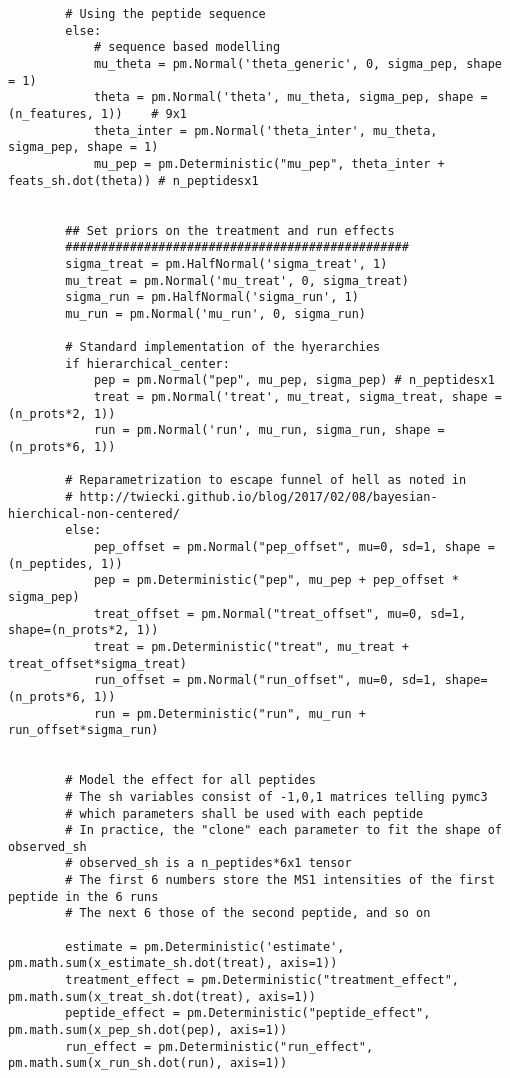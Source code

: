 \documentclass[a4paper]{article}
\begin{document}
\begin{verbatim}
        # Using the peptide sequence
        else: 
            # sequence based modelling
            mu_theta = pm.Normal('theta_generic', 0, sigma_pep, shape = 1)
            theta = pm.Normal('theta', mu_theta, sigma_pep, shape = (n_features, 1))    # 9x1
            theta_inter = pm.Normal('theta_inter', mu_theta, sigma_pep, shape = 1)
            mu_pep = pm.Deterministic("mu_pep", theta_inter + feats_sh.dot(theta)) # n_peptidesx1


        ## Set priors on the treatment and run effects
        ################################################    
        sigma_treat = pm.HalfNormal('sigma_treat', 1)
        mu_treat = pm.Normal('mu_treat', 0, sigma_treat)
        sigma_run = pm.HalfNormal('sigma_run', 1)
        mu_run = pm.Normal('mu_run', 0, sigma_run)

        # Standard implementation of the hyerarchies
        if hierarchical_center:
            pep = pm.Normal("pep", mu_pep, sigma_pep) # n_peptidesx1
            treat = pm.Normal('treat', mu_treat, sigma_treat, shape = (n_prots*2, 1))
            run = pm.Normal('run', mu_run, sigma_run, shape = (n_prots*6, 1))

        # Reparametrization to escape funnel of hell as noted in
        # http://twiecki.github.io/blog/2017/02/08/bayesian-hierchical-non-centered/
        else:
            pep_offset = pm.Normal("pep_offset", mu=0, sd=1, shape = (n_peptides, 1))
            pep = pm.Deterministic("pep", mu_pep + pep_offset * sigma_pep)
            treat_offset = pm.Normal("treat_offset", mu=0, sd=1, shape=(n_prots*2, 1))
            treat = pm.Deterministic("treat", mu_treat + treat_offset*sigma_treat)
            run_offset = pm.Normal("run_offset", mu=0, sd=1, shape=(n_prots*6, 1))
            run = pm.Deterministic("run", mu_run + run_offset*sigma_run)


        # Model the effect for all peptides
        # The sh variables consist of -1,0,1 matrices telling pymc3
        # which parameters shall be used with each peptide
        # In practice, the "clone" each parameter to fit the shape of observed_sh
        # observed_sh is a n_peptides*6x1 tensor
        # The first 6 numbers store the MS1 intensities of the first peptide in the 6 runs
        # The next 6 those of the second peptide, and so on

        estimate = pm.Deterministic('estimate', pm.math.sum(x_estimate_sh.dot(treat), axis=1))
        treatment_effect = pm.Deterministic("treatment_effect", pm.math.sum(x_treat_sh.dot(treat), axis=1))
        peptide_effect = pm.Deterministic("peptide_effect", pm.math.sum(x_pep_sh.dot(pep), axis=1))
        run_effect = pm.Deterministic("run_effect", pm.math.sum(x_run_sh.dot(run), axis=1))


\end{verbatim}
\end{document}
